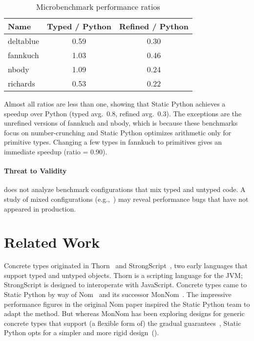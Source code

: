 \documentclass[english,cleveref,crc]{programming}
\newcommand{\SP}{Static Python}
\newcommand{\bmname}[1]{\textsf{#1}}
\begin{document}
\begin{table}[t]
  \caption{Microbenchmark performance ratios}
  \label{t:microbenchmark}

  \centering
  \begin{tabular}{lSS}\toprule
    Name               & {Typed / Python} & {Refined / Python} \\\midrule
    \bmname{deltablue} &         0.59 &           0.30 \\
    \bmname{fannkuch}  &         1.03 &           0.46 \\
    \bmname{nbody}     &         1.09 &           0.24 \\
    \bmname{richards}  &         0.53 &           0.22 \\
    \bottomrule    
  \end{tabular}

\end{table}

Almost all ratios are less than one, showing that \SP{} achieves a speedup over
Python (typed avg.~\num{0.8}, refined avg.~\num{0.3}).
The exceptions are the unrefined versions of \bmname{fannkuch} and
\bmname{nbody}, which is because these benchmarks focus
on number-crunching and \SP{} optimizes arithmetic only for primitive types.
Changing a few types in \bmname{fannkuch} to primitives
gives an immediate speedup (ratio = \num{0.90}).


\paragraph{Threat to Validity}

 does not analyze benchmark configurations that mix
typed and untyped code. %
A study of mixed configurations (e.g.,~\cite{gm-pepm-2018,gtnffvf-jfp-2019})
may reveal performance bugs that have not appeared in production.


\section{Related Work}
\label{s:related}

Concrete types originated in Thorn~\cite{bfnorsvw-oopsla-2009,wzlov-popl-2010}
and StrongScript~\cite{rzv-ecoop-2015}, two early languages that support typed
and untyped objects.
Thorn is a scripting language for the JVM; StrongScript is designed to
interoperate with JavaScript.
Concrete types came to \SP{} by way of Nom~\cite{mt-oopsla-2017} and its
successor MonNom~\cite{mt-oopsla-2021}.
The impressive performance figures in the original Nom paper inspired the \SP{}
team to adapt the method.
But whereas MonNom has been exploring designs for generic concrete types that
support (a flexible form of) the gradual guarantees~\cite{svcb-snapl-2015},
\SP{} opts for a simpler and more rigid design~().
\end{document}
